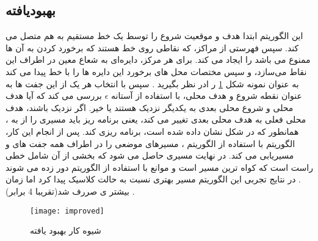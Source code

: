 
\subsection{بهبودیافته}
این الگوریتم ابتدا هدف و موقعیت شروع را توسط یک خط مستقیم به هم متصل می کند. سپس فهرستی از مراکز، که نقاطی روی خط هستند که برخورد کردن به آن ها ممنوع می باشد را  ایجاد می کند. برای هر مرکز، دایره‌ای به شعاع معین  
در اطراف این نقاط می‌سازد، و سپس مختصات محل های برخورد این دایره ها را با خط پیدا می کند به عنوان نمونه شکل 
\ref{improved}
ر ادر نظر بگیرید . سپس با انتخاب هر یک از این جفت ها به عنوان نقطه شروع و هدف محلی، با استفاده از آستانه
$\epsilon$
بررسی می کند که آیا هدف محلی 
و شروع محلی بعدی 
به یکدیگر نزدیک هستند یا خیر. اگر نزدیک باشند، هدف محلی فعلی به هدف محلی بعدی تغییر می کند، یعنی برنامه ریز باید مسیری را از 
به
، همانطور که در شکل نشان داده شده است، برنامه ریزی کند. پس از انجام این کار، الگوریتم با استفاده از الگوریتم 
، مسیرهای موضعی را در اطراف همه جفت های 
و 
مسیریابی می کند.  در نهایت مسیری حاصل می شود که بخشی از آن شامل خطی راست است که کواه ترین مسیر است و موانع با استفاده از الگوریتم
دور زده می شوند .
در نتایج تجربی این الگوریتم مسیر بهتری نسبت به حالت کلاسیک پیدا کرد اما زمان بیشتر ی صررف شد(تقریبا 4 برابر) .
\begin{figure}[h]
	\texttt{[image: improved]}
	\centering
	\caption{ شیوه کار  بهبود یافته}
	\cite{paliwal2023survey}
	\label{improved}
\end{figure}
